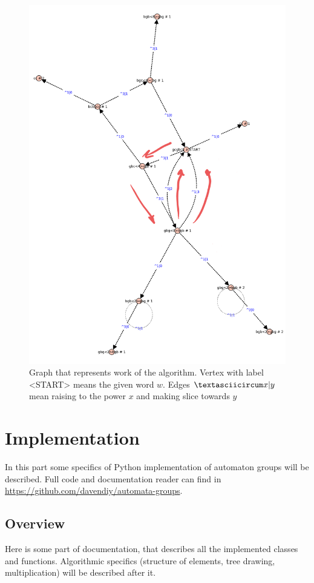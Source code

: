 \documentclass[a4paper,12pt]{amsart}
\begin{document}
\begin{figure}[h]
	\includegraphics[scale=0.25]{order_graph.png}
	\caption{Graph that represents work of the algorithm. Vertex with label <START> means the given word $w$. Edges $\textasciicircum x | y$ mean raising to the power $x$ and making slice towards $y$}
\end{figure}



\newpage
\section{Implementation}

In this part some specifics of Python implementation of automaton groups will be described. Full code and documentation reader can find in \url{https://github.com/davendiy/automata-groups}.

\subsection{Overview}
Here is some part of documentation, that describes all the implemented classes and functions. Algorithmic specifics (structure of elements, tree drawing, multiplication) will be described after it.
\end{document}
